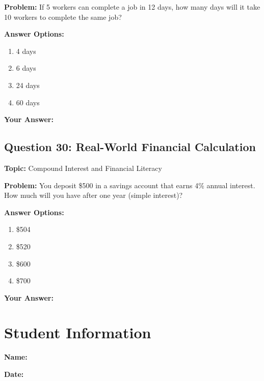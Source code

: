 \documentclass[12pt]{article}
\begin{document}
\textbf{Problem:} If 5 workers can complete a job in 12 days, how many days will it take 10 workers to complete the same job?

\textbf{Answer Options:}
\begin{enumerate}[label=\Alph*)]
    \item 4 days
    \item 6 days
    \item 24 days
    \item 60 days
\end{enumerate}

\noindent\textbf{Your Answer:} \underline{\hspace{2cm}}

\vspace{0.5cm}


\subsection{Question 30: Real-World Financial Calculation}
\textbf{Topic:} Compound Interest and Financial Literacy

\textbf{Problem:} You deposit \$500 in a savings account that earns 4\% annual interest. How much will you have after one year (simple interest)?

\textbf{Answer Options:}
\begin{enumerate}[label=\Alph*)]
    \item \$504
    \item \$520
    \item \$600
    \item \$700
\end{enumerate}

\noindent\textbf{Your Answer:} \underline{\hspace{2cm}}

\newpage


\section*{Student Information}

\noindent\textbf{Name:} \underline{\hspace{8cm}}

\noindent\textbf{Date:} \underline{\hspace{8cm}}
\end{document}

